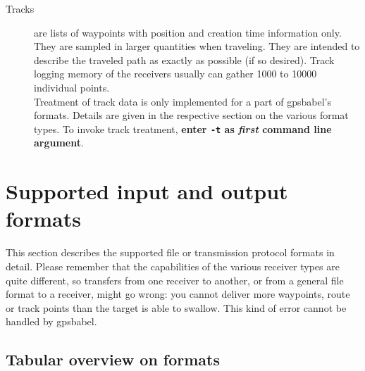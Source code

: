 \documentclass[12pt]{article}
\newcommand{\gpsbabel}{{\sc gpsbabel}}
\begin{document}
\begin{description}
\item[Tracks] are lists of waypoints with position and creation time information only. They are sampled in larger quantities when traveling. They are intended to describe the traveled path as exactly as possible (if so desired). Track logging memory of the receivers usually can gather 1000 to 10000 individual points.\\
Treatment of track data is only implemented for a part of \gpsbabel 's formats. Details are given in the respective section on the various format types. To invoke track treatment, {\bfseries enter {\tt -t} as {\em first} command line argument}.

\end{description}



\section{Supported input and output formats}

This section describes the supported file or transmission protocol formats in detail. Please remember that the capabilities of the various receiver types are quite different, so transfers from one receiver to another, or from a general file format to a receiver, might go wrong: you cannot deliver more waypoints, route or track points than the target is able to swallow. This kind of error cannot be handled by \gpsbabel .



\subsection{Tabular overview on formats}
\end{document}

